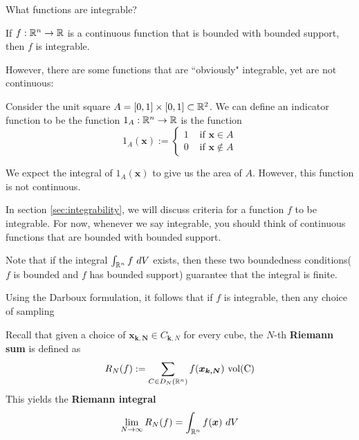 \begin{motivating}
    What functions are integrable?
\end{motivating}

    \begin{example}
    \begin{theorem}
     If $f : \mathbb{R}^n \to \mathbb{R}$ is a continuous function that is bounded with bounded support, then $f$ is integrable.   
    \end{theorem}

    \end{example}

    
However, there are some functions that are ``obviously" integrable, yet are not continuous:

\begin{example}
    Consider the unit square $A = [0,1] \times [0,1] \subset \mathbb{R}^2$.   We can define an indicator function to be the function $1_A  :\mathbb{R}^n \to \mathbb{R}$ is the function 
    $$1_A(\bm{x}) := \left\{
		\begin{array}{ll}
			1 & \text{ if } \bm{x} \in A \\
			0 & \text{ if } \bm{x} \notin A
		\end{array}
		\right.$$

  We expect the integral of $1_A(\bm{x})$ to give us the area of $A$.  However, this function is not continuous.
\end{example}
    
    In section \ref{sec:integrability}, we will discuss criteria for a function $f$ to be integrable.  For now, whenever we say integrable, you should think of continuous functions that are bounded with bounded support.



\begin{remark}
Note that if the integral $\int_{\R^n} f \ dV$ exists, then these two boundedness conditions($f$ is bounded and $f$ has bounded support) guarantee that the integral is finite.    
\end{remark}



\begin{remark}
    Using the Darboux formulation, it follows that if $f$ is integrable, then any choice of sampling  
\end{remark}

\begin{definition}
    Recall that given a choice of $\bm{x_{k,N}} \in C_{\bm{k},N}$ for every cube, the $N$-th \textbf{Riemann sum} is defined as 
    $$R_N(f) := \sum_{C \in D_N(\mathbb{R}^n)} f(\bm{x_{k,N}}) \ \textnormal{vol(C)}$$
    This yields the \textbf{Riemann integral}
    $$\lim_{N \to \infty} R_N(f) = \int_{\mathbb{R}^n} f(\bm{x}) \ dV$$
\end{definition}


